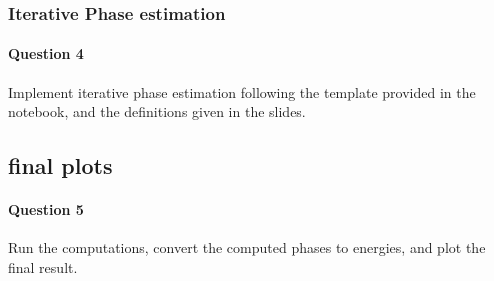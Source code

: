 \documentclass{article}
\begin{document}
\subsubsection{Iterative Phase estimation}

\paragraph{Question 4} Implement iterative phase estimation following the template provided in the notebook, 
and the definitions given in the slides.

\subsection{final plots}

\paragraph{Question 5} Run the computations, convert the computed phases to energies, and plot the final result.



\end{document}
